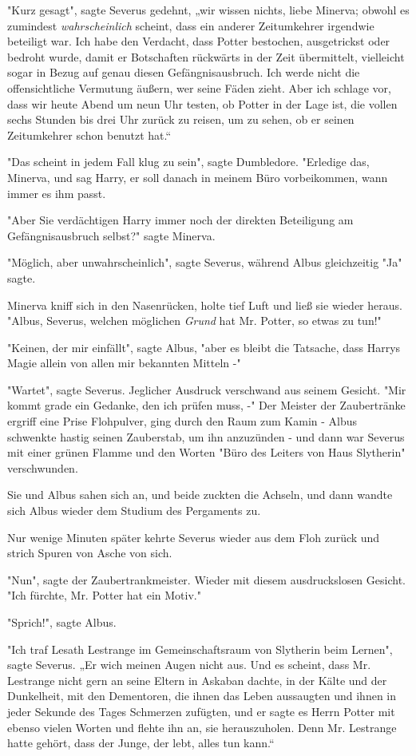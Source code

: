 {"Kurz gesagt", sagte Severus gedehnt, „wir wissen nichts, liebe Minerva; obwohl es zumindest \emph{wahrscheinlich} scheint, dass ein anderer Zeitumkehrer irgendwie beteiligt war. Ich habe den Verdacht, dass Potter bestochen, ausgetrickst oder bedroht wurde, damit er Botschaften rückwärts in der Zeit übermittelt, vielleicht sogar in Bezug auf genau diesen Gefängnisausbruch. Ich werde nicht die offensichtliche Vermutung äußern, wer seine Fäden zieht. Aber ich schlage vor, dass wir heute Abend um neun Uhr testen, ob Potter in der Lage ist, die vollen sechs Stunden bis drei Uhr zurück zu reisen, um zu sehen, ob er seinen Zeitumkehrer schon benutzt hat.“

"Das scheint in jedem Fall klug zu sein", sagte Dumbledore. "Erledige das, Minerva, und sag Harry, er soll danach in meinem Büro vorbeikommen, wann immer es ihm passt.

"Aber Sie verdächtigen Harry immer noch der direkten Beteiligung am Gefängnisausbruch selbst?" sagte Minerva.

"Möglich, aber unwahrscheinlich", sagte Severus, während Albus gleichzeitig "Ja" sagte.

Minerva kniff sich in den Nasenrücken, holte tief Luft und ließ sie wieder heraus. "Albus, Severus, welchen möglichen \emph{Grund} hat Mr. Potter, so etwas zu tun!"

"Keinen, der mir einfällt", sagte Albus, "aber es bleibt die Tatsache, dass Harrys Magie allein von allen mir bekannten Mitteln -"

"Wartet", sagte Severus. Jeglicher Ausdruck verschwand aus seinem Gesicht. "Mir kommt grade ein Gedanke, den ich prüfen muss, -" Der Meister der Zaubertränke ergriff eine Prise Flohpulver, ging durch den Raum zum Kamin - Albus schwenkte hastig seinen Zauberstab, um ihn anzuzünden - und dann war Severus mit einer grünen Flamme und den Worten "Büro des Leiters von Haus Slytherin" verschwunden.

Sie und Albus sahen sich an, und beide zuckten die Achseln, und dann wandte sich Albus wieder dem Studium des Pergaments zu.

Nur wenige Minuten später kehrte Severus wieder aus dem Floh zurück und strich Spuren von Asche von sich.

"Nun", sagte der Zaubertrankmeister. Wieder mit diesem ausdruckslosen Gesicht. "Ich fürchte, Mr. Potter hat ein Motiv."

"Sprich!", sagte Albus.

"Ich traf Lesath Lestrange im Gemeinschaftsraum von Slytherin beim Lernen", sagte Severus. „Er wich meinen Augen nicht aus. Und es scheint, dass Mr. Lestrange nicht gern an seine Eltern in Askaban dachte, in der Kälte und der Dunkelheit, mit den Dementoren, die ihnen das Leben aussaugten und ihnen in jeder Sekunde des Tages Schmerzen zufügten, und er sagte es Herrn Potter mit ebenso vielen Worten und flehte ihn an, sie herauszuholen. Denn Mr. Lestrange hatte gehört, dass der Junge, der lebt, alles tun kann.“

}
